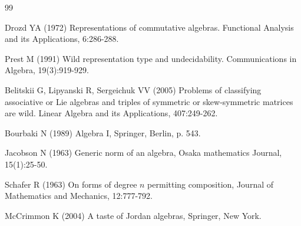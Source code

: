 \documentclass{amsart}
\numberwithin{equation}{section}
\theoremstyle{definition}
\numberwithin{theorem}{section}
\begin{document}
   \begin{thebibliography}{99}
   
     Drozd YA (1972) Representations of commutative algebras. Functional Analysis and its Applications, 6:286-288.
   
        Prest M (1991) Wild representation type and undecidability.  Communications in Algebra, 19(3):919-929.
       
        Belitskii G, Lipyanski R, Sergeichuk VV (2005) Problems of classifying associative or Lie algebras and triples of symmetric or skew-symmetric matrices are wild.  Linear Algebra and its Applications, 407:249-262.
                      
   Bourbaki N (1989) Algebra I, Springer, Berlin, p. 543.
  
               Jacobson N  (1963) Generic norm of an algebra, Osaka mathematics Journal, 15(1):25-50.
  
          Schafer R (1963) On forms of degree $n$ permitting composition, Journal of Mathematics and Mechanics, 12:777-792. 
         
      
        McCrimmon K (2004) A taste of Jordan algebras, Springer, New York.
       
      \end{thebibliography}
   
   
\end{document}
